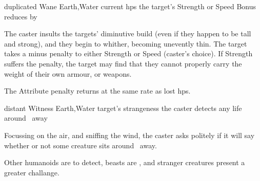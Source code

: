   {duplicated}%
  {Wane}%
  {Earth,Water}%
  {current \glspl{hp}}%
  {the target's Strength or Speed Bonus reduces by }%
  {
    The caster insults the targets' diminutive build (even if they happen to be tall and strong), and they begin to whither, becoming unevently thin.
    The target takes a minus  penalty to either Strength or Speed (caster's choice).
    If Strength suffers the penalty, the target may find that they cannot properly carry the weight of their own armour, or weapons.

    The Attribute penalty returns at the same rate as lost \glspl{hp}.
  }

  {distant}%
  {Witness}%
  {Earth,Water}%
  {target's strangeness}%
  {the caster detects any life around \spellRange\ away}%
  {
    Focussing on the air, and sniffing the wind, the caster asks politely if it will say whether or not some creature sits around \spellRange\ away.

    Other humanoids are \tn[7] to detect, beasts are \tn[9], and stranger creatures present a greater challange.
  }

